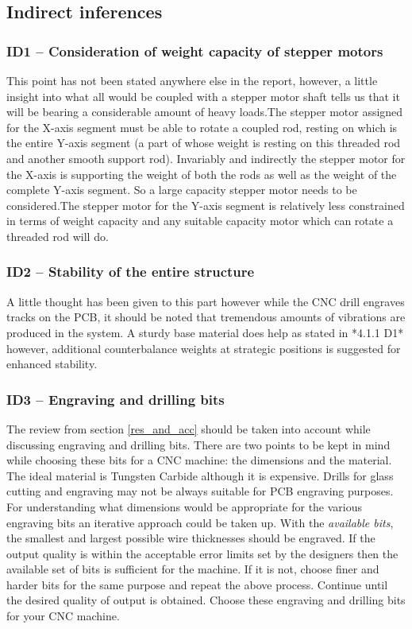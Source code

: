 \subsection{Indirect inferences}

\subsubsection*{ID1 – Consideration of weight capacity of stepper motors}

This point has not been stated anywhere else in the report, however, a little insight into what all would be coupled with a stepper motor shaft tells us that it will be bearing a considerable amount of heavy loads.The stepper motor assigned for the X-axis segment must be able to rotate a coupled rod, resting on which is the entire Y-axis segment (a part of whose weight is resting on this threaded rod and another smooth support rod). Invariably and indirectly the stepper motor for the X-axis is supporting the weight of both the rods as well as the weight of the complete Y-axis segment. So a large capacity stepper motor needs to be considered.The stepper motor for the Y-axis segment is relatively less constrained in terms of weight capacity and any suitable capacity motor which can rotate a threaded rod will do.

\subsubsection*{ID2 – Stability of the entire structure}

A little thought has been given to this part however while the CNC drill engraves tracks on the PCB, it should be noted that tremendous amounts of vibrations are produced in the system. A sturdy base material does help as stated in *4.1.1 D1* however, additional counterbalance weights at strategic positions is suggested for enhanced stability.

\subsubsection*{ID3 – Engraving and drilling bits}

The review from section \ref{res_and_acc} should be taken into account while discussing engraving and drilling bits. There are two points to be kept in mind while choosing these bits for a CNC machine: the dimensions and the material. The ideal material is Tungsten Carbide although it is expensive. Drills for glass cutting and engraving may not be always suitable for PCB engraving purposes. For understanding what dimensions would be appropriate for the various engraving bits an iterative approach could be taken up. With the \textit{available bits}, the smallest and largest possible wire thicknesses should be engraved. If the output quality is within the acceptable error limits set by the designers then the available set of bits is sufficient for the machine. If it is not, choose finer and harder bits for the same purpose and repeat the above process. Continue until the desired quality of output is obtained. Choose these engraving and drilling bits for your CNC machine.

